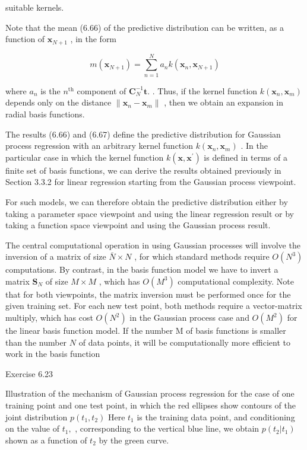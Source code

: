 \documentclass[
  10
]{article}
\begin{document}
suitable kernels.

Note that the mean (6.66) of the predictive distribution can be written,
as a function of \(\mathbf { x } _ { N + 1 }\) , in the form

\[
m (\mathbf {x} _ {N + 1}) = \sum_ {n = 1} ^ {N} a _ {n} k (\mathbf {x} _ {n}, \mathbf {x} _ {N + 1})\tag{6.68}
\]

where \(a _ { n }\) is the \(n ^ { \mathrm { t h } }\) component of
\(\mathbf { C } _ { N } ^ { - 1 } \mathbf { t } .\) . Thus, if the
kernel function \(k ( \mathbf { x } _ { n } , \mathbf { x } _ { m } )\)
depends only on the distance
\(\| \mathbf { x } _ { n } - \mathbf { x } _ { m } \|\) , then we obtain
an expansion in radial basis functions.

The results (6.66) and (6.67) define the predictive distribution for
Gaussian process regression with an arbitrary kernel function
\(k ( \mathbf { x } _ { n } , \mathbf { x } _ { m } )\) . In the
particular case in which the kernel function
\(k ( \mathbf { x } , \mathbf { x } ^ { \prime } )\) is defined in terms
of a finite set of basis functions, we can derive the results obtained
previously in Section 3.3.2 for linear regression starting from the
Gaussian process viewpoint.

For such models, we can therefore obtain the predictive distribution
either by taking a parameter space viewpoint and using the linear
regression result or by taking a function space viewpoint and using the
Gaussian process result.

The central computational operation in using Gaussian processes will
involve the inversion of a matrix of size \(\bar { N } \times N\) , for
which standard methods require \(O ( N ^ { 3 } )\) computations. By
contrast, in the basis function model we have to invert a matrix
\(\mathbf { S } _ { N }\) of size \(M \times M\) , which has
\(O ( M ^ { 3 } )\) computational complexity. Note that for both
viewpoints, the matrix inversion must be performed once for the given
training set. For each new test point, both methods require a
vector-matrix multiply, which has cost \(O ( N ^ { 2 } )\) in the
Gaussian process case and \(O ( M ^ { 2 } )\) for the linear basis
function model. If the number M of basis functions is smaller than the
number \(N\) of data points, it will be computationally more efficient
to work in the basis function

Exercise 6.23

Illustration of the mechanism of Gaussian process regression for the
case of one training point and one test point, in which the red ellipses
show contours of the joint distribution \(p ( t _ { 1 } , t _ { 2 } )\)
Here \(t _ { 1 }\) is the training data point, and conditioning on the
value of \(t _ { 1 } ,\) , corresponding to the vertical blue line, we
obtain \(p ( t _ { 2 } | t _ { 1 } )\) shown as a function of
\(t _ { 2 }\) by the green curve.
\end{document}

